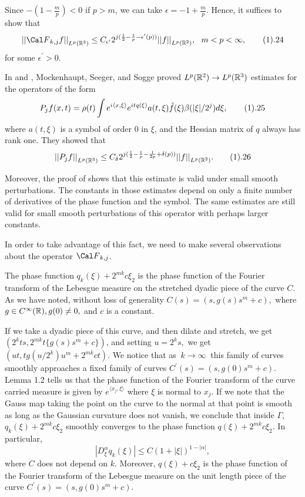 Since $-(1-\frac{m}{p})<0$ if $p>m$, we can take 
$\epsilon=-1+\frac{m}{p}$. Hence, it suffices to show that 
$$ {||{\Cal F}_{k,j}f||}_{L^p({\Bbb R}^3)} \leq C_{\epsilon^{\prime}} 
2^{j(\frac{1}{2} -\frac{1}{p}-\epsilon^{\prime}(p))} 
{||f||}_{L^p({\Bbb R}^2)}, \ \ m<p<\infty, \tag1.24$$ for some
${\epsilon}^{\prime}>0$. 

In \cite{MSSo1} and \cite{MSSo2}, Mockenhaupt, Seeger, and Sogge proved 
$L^p({\Bbb R}^2) \rightarrow L^p({\Bbb R}^3)$ estimates for the operators
of the form 
$$ P_jf(x,t)=\rho(t) \int e^{i\langle x,\xi \rangle} e^{itq(\xi)} a(t,\xi) 
\hat{f}(\xi) \beta(|\xi|/2^j) d\xi, \tag1.25$$ 
where $a(t,\xi)$ is a symbol of order $0$ in $\xi$, and the Hessian matrix
of $q$ always has rank one. They showed that 
$$ {||P_jf||}_{L^p({\Bbb R}^3)} \leq C_{\delta} 
2^{j(\frac{1}{2}-\frac{1}{p}-\frac{1}{2p}+\delta(p))} {||f||}_{L^p({\Bbb R}^2)}.
\tag 1.26$$ 

Moreover, the proof of \cite{MSSo2} shows that this estimate is valid under
small smooth perturbations. The constants in those estimates depend on only
a finite number of derivatives of the phase function and the symbol. The 
same estimates are still valid for small smooth perturbations of this 
operator with perhaps larger constants.  

In order to take advantage of this fact, we need
to make several observations about the operator ${\Cal F}_{k,j}$. 

The phase function $q_k(\xi)+2^{mk}c{\xi}_2$ is the phase
function of the Fourier transform of the Lebesgue measure on the 
stretched dyadic piece of the
curve $C$. As we have noted, without loss of generality 
$C(s)=(s,g(s)s^m+c),$ where  
$g \in C^\infty({\Bbb R}), g(0) \neq 0,$ and $c$ is a constant. 

If we take a dyadic piece of this curve, and then dilate and stretch, 
we get \newline
$(2^kts,2^{mk}t\{g(s)s^m+c\})$, and setting $u=2^ks,$ we
get $(ut,tg(u/2^k)u^m+2^{mk}ct).$ We notice that as $\ k \rightarrow \infty \ $
this family of curves smoothly approaches a fixed family of curves 
$C^{\prime}(s)=(s,g(0)s^m+c)$. Lemma 1.2 tells us that the phase function
of the Fourier transform of the curve carried measure is given by 
$e^{\langle{x}_j,\xi\rangle}$ where $\xi$ is normal to ${x}_j$. 
If we note that the Gauss
map taking the point on the curve to the normal at that point is smooth as
long as the Gaussian curvature does not vanish, we conclude that 
inside $\Gamma$, $q_k(\xi)+2^{mk}c{\xi}_2$ smoothly converges  
to the phase function $q(\xi)+2^{mk}c{\xi}_2$. In particular, 
$$ |D^{\alpha}_{\xi}q_k(\xi)| \leq C{(1+|\xi|)}^{1-|\alpha|},$$ 
where $C$ does not depend on $k$. 
Moreover, $q(\xi)+c{\xi}_2$ is the phase function of the Fourier transform
of the  Lebesgue measure on the unit length piece of the curve
\newline $C^{\prime}(s)=(s,g(0)s^m+c)$.

